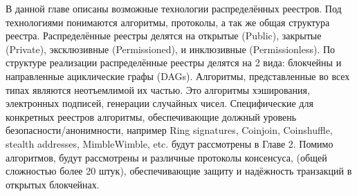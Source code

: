В данной главе описаны возможные технологии распределённых реестров. Под
технологиями понимаются алгоритмы, протоколы, а так же общая структура реестра.
Распределённые реестры делятся на открытые (Public), закрытые (Private),
эксклюзивные (Permissioned), и инклюзивные (Permissionless).
По структуре реализации распределённые реестры делятся на 2 вида: блокчейны и
направленные ациклические графы (DAGs). Алгоритмы, представленные во всех типах
являются неотъемлимой их частью. Это алгоритмы хэширования, электронных
подписей, генерации случайных чисел. Специфические для конкретных реестров
алгоритмы, обеспечивающие должный уровень безопасности/анонимности, например
Ring signatures, Coinjoin, Coinshuffle, stealth addresses, MimbleWimble, etc.
будут рассмотрены в Главе 2. Помимо алгоритмов, будут рассмотрены и различные
протоколы консенсуса, (общей сложностью более 20 штук), обеспечивающие защиту и
надёжность транзакций в открытых блокчейнах.

